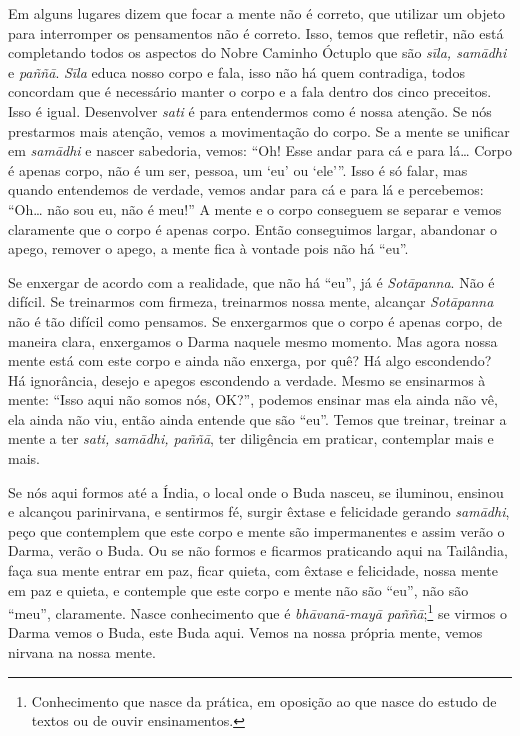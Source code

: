 Em alguns lugares dizem que focar a mente não é correto, que
utilizar um objeto para interromper os pensamentos não é correto. Isso,
temos que refletir, não está completando todos os aspectos do Nobre
Caminho Óctuplo que são \textit{sīla, samādhi} e\textit{ paññā}.
\textit{Sīla} educa nosso corpo e fala, isso não há quem contradiga,
todos concordam que é necessário manter o corpo e a fala dentro dos
cinco preceitos. Isso é igual. Desenvolver \textit{sati} é para
entendermos como é nossa atenção. Se nós prestarmos mais atenção, vemos
a movimentação do corpo. Se a mente se unificar em \textit{samādhi} e
nascer sabedoria, vemos: “Oh! Esse andar para cá e para lá… Corpo é
apenas corpo, não é um ser, pessoa, um ‘eu’ ou ‘ele’”. Isso é só falar,
mas quando entendemos de verdade, vemos andar para cá e para lá e
percebemos: “Oh… não sou eu, não é meu!” A mente e o corpo conseguem se
separar e vemos claramente que o corpo é apenas corpo. Então
conseguimos largar, abandonar o apego, remover o apego, a mente fica à
vontade pois não há “eu”. 

Se enxergar de acordo com a realidade, que não há “eu”, já é
\textit{Sotāpanna}. Não é difícil. Se treinarmos com firmeza,
treinarmos nossa mente, alcançar \textit{Sotāpanna} não é tão difícil
como pensamos. Se enxergarmos que o corpo é apenas corpo, de maneira
clara, enxergamos o Darma naquele mesmo momento. Mas agora nossa mente
está com este corpo e ainda não enxerga, por quê? Há algo escondendo?
Há ignorância, desejo e apegos escondendo a verdade. Mesmo se
ensinarmos à mente: “Isso aqui não somos nós, OK?”, podemos ensinar mas
ela ainda não vê, ela ainda não viu, então ainda entende que são “eu”.
Temos que treinar, treinar a mente a ter \textit{sati, samādhi,
paññā}, ter diligência em praticar, contemplar mais e mais. 

Se nós aqui formos até a Índia, o local onde o Buda nasceu, se
iluminou, ensinou e alcançou parinirvana, e sentirmos fé, surgir êxtase
e felicidade gerando \textit{samādhi}, peço que contemplem que este
corpo e mente são impermanentes e assim verão o Darma, verão o Buda. Ou
se não formos e ficarmos praticando aqui na Tailândia, faça sua mente
entrar em paz, ficar quieta, com êxtase e felicidade, nossa mente em
paz e quieta, e contemple que este corpo e mente não são “eu”, não são
“meu”, claramente. Nasce conhecimento que é \textit{bhāvanā-mayā
paññā};\footnote{Conhecimento que nasce da prática, em oposição ao que
nasce do estudo de textos ou de ouvir ensinamentos.} se virmos o Darma
vemos o Buda, este Buda aqui. Vemos na nossa própria mente, vemos
nirvana na nossa mente. 

